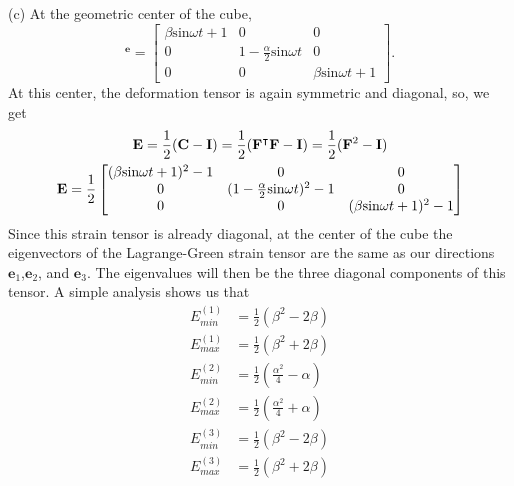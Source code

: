 \medskip
(c) At the geometric center of the cube,
\begin{equation*}
    [\bn{F}(\bm{X}_{c})]^{\bm{e}}=\begin{bmatrix}
        \beta\text{sin}\omega t+1& 0& 0\\ 0& 1-\frac{\alpha}{2}\text{sin}\omega t&0 \\0 & 0&\beta\text{sin}\omega t+1 \end{bmatrix}.
\end{equation*}
At this center, the deformation tensor is again symmetric and diagonal, so, we get
\begin{gather*}
    \mathbf{E}=\frac{1}{2}(\mathbf{C}-\mathbf{I})=\frac{1}{2}(\mathbf{F}^\intercal\mathbf{F}-\mathbf{I})=\frac{1}{2}(\mathbf{F}^2-\mathbf{I})\\
    \mathbf{E}=\frac{1}{2}\begin{bmatrix}
        (\beta\text{sin}\omega t+1)^2-1& 0& 0\\ 0& (1-\frac{\alpha}{2}\text{sin}\omega t)^2-1&0 \\0 & 0&(\beta\text{sin}\omega t+1)^2-1
    \end{bmatrix}
\end{gather*}
Since this strain tensor is already diagonal, at the center of the cube the eigenvectors of the Lagrange-Green strain tensor are the same as our directions $\bm{e}_1$,$\bm{e}_2$, and $\bm{e}_3$. The eigenvalues will then be the three diagonal components of this tensor. A simple analysis shows us that 
\begin{align*}
    E_{min}^{(1)}&=\frac{1}{2}(\beta^2-2\beta)\\
    E_{max}^{(1)}&=\frac{1}{2}(\beta^2+2\beta)\\
    E_{min}^{(2)}&=\frac{1}{2}(\frac{\alpha^2}{4}-\alpha)\\ 
    E_{max}^{(2)}&=\frac{1}{2}(\frac{\alpha^2}{4}+\alpha)\\
    E_{min}^{(3)}&=\frac{1}{2}(\beta^2-2\beta)\\
    E_{max}^{(3)}&=\frac{1}{2}(\beta^2+2\beta)\\
\end{align*}

